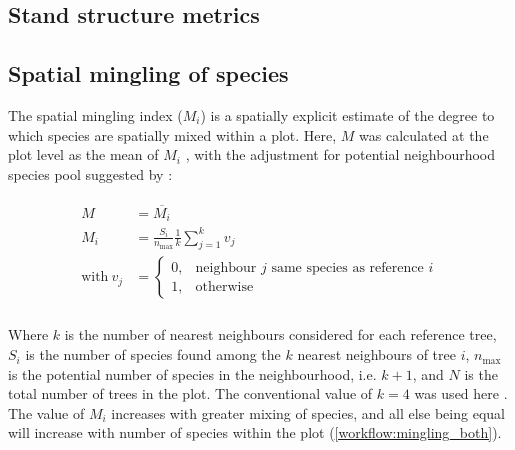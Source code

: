 \begin{refsection}
\section{Stand structure metrics}

\subsection{Spatial mingling of species}

The spatial mingling index ($M_{i}$) is a spatially explicit estimate of the degree to which species are spatially mixed within a plot. Here, $M$ was calculated at the plot level as the mean of $M_{i}$ \citep{Gadow2002}, with the adjustment for potential neighbourhood species pool suggested by \citet{Hui2011}: 

\begin{align}
\begin{split}
	M &= \overline{M_{i}} \\
	M_{i} &= \frac{S_{i}}{n_{\text{max}}} \frac{1}{k} \sum_{j=1}^{k} v_{j} \\
	\text{with}\ v_{j} &= \begin{cases}
		0,& \text{neighbour $j$ same species as reference $i$} \\
		1,& \text{otherwise}
	\end{cases} \\
\end{split}
\end{align}

Where $k$ is the number of nearest neighbours considered for each reference tree, $S_{i}$ is the number of species found among the $k$ nearest neighbours of tree $i$, $n_{\text{max}}$ is the potential number of species in the neighbourhood, i.e. $k + 1$, and $N$ is the total number of trees in the plot. The conventional value of $k = 4$ was used here \citep{Gadow2002, Hui2004, Hui2007}. The value of $M_{i}$ increases with greater mixing of species, and all else being equal will increase with number of species within the plot (\autoref{workflow:mingling_both}).


\end{refsection}

